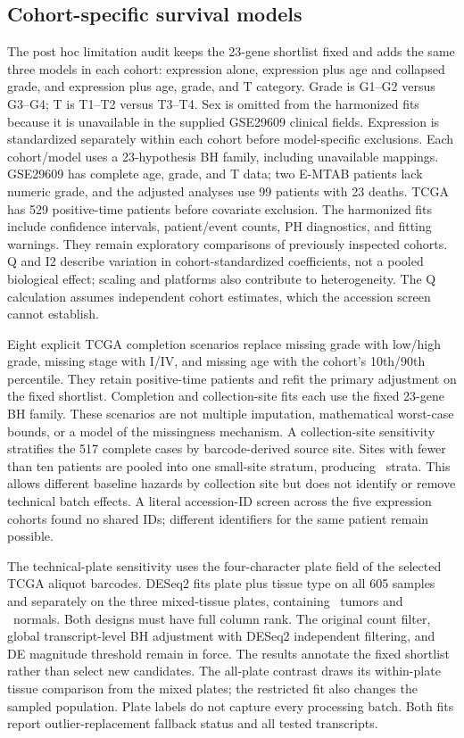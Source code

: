 \subsection{Cohort-specific survival models}
The post hoc limitation audit keeps the 23-gene shortlist fixed and adds the same three models in each cohort: expression alone, expression plus age and collapsed grade, and expression plus age, grade, and T category. Grade is G1--G2 versus G3--G4; T is T1--T2 versus T3--T4. Sex is omitted from the harmonized fits because it is unavailable in the supplied GSE29609 clinical fields. Expression is standardized separately within each cohort before model-specific exclusions. Each cohort/model uses a 23-hypothesis BH family, including unavailable mappings. GSE29609 has complete age, grade, and T data; two E-MTAB patients lack numeric grade, and the adjusted analyses use 99 patients with 23 deaths. TCGA has 529 positive-time patients before covariate exclusion. The harmonized fits include confidence intervals, patient/event counts, PH diagnostics, and fitting warnings. They remain exploratory comparisons of previously inspected cohorts. Q and I2 describe variation in cohort-standardized coefficients, not a pooled biological effect; scaling and platforms also contribute to heterogeneity. The Q calculation assumes independent cohort estimates, which the accession screen cannot establish.

Eight explicit TCGA completion scenarios replace missing grade with low/high grade, missing stage with I/IV, and missing age with the cohort's 10th/90th percentile. They retain positive-time patients and refit the primary adjustment on the fixed shortlist. Completion and collection-site fits each use the fixed 23-gene BH family. These scenarios are not multiple imputation, mathematical worst-case bounds, or a model of the missingness mechanism. A collection-site sensitivity stratifies the 517 complete cases by barcode-derived source site. Sites with fewer than ten patients are pooled into one small-site stratum, producing \LimitSiteStrata\ strata. This allows different baseline hazards by collection site but does not identify or remove technical batch effects. A literal accession-ID screen across the five expression cohorts found no shared IDs; different identifiers for the same patient remain possible.

The technical-plate sensitivity uses the four-character plate field of the selected TCGA aliquot barcodes. DESeq2 fits plate plus tissue type on all 605 samples and separately on the three mixed-tissue plates, containing \LimitMixedTumors\ tumors and \LimitMixedNormals\ normals. Both designs must have full column rank. The original count filter, global transcript-level BH adjustment with DESeq2 independent filtering, and DE magnitude threshold remain in force. The results annotate the fixed shortlist rather than select new candidates. The all-plate contrast draws its within-plate tissue comparison from the mixed plates; the restricted fit also changes the sampled population. Plate labels do not capture every processing batch. Both fits report outlier-replacement fallback status and all tested transcripts.


